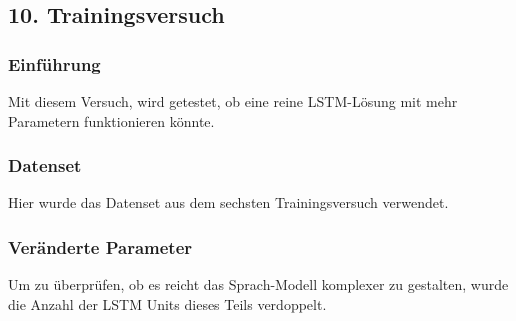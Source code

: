 \documentclass[pdftex,a4paper,halfparskip, article]{scrartcl}
\begin{document}
\subsection{10. Trainingsversuch}

\subsubsection*{Einführung}

Mit diesem Versuch, wird getestet, ob eine reine LSTM-Lösung mit mehr Parametern funktionieren könnte. 

\subsubsection*{Datenset}

Hier wurde das Datenset aus dem sechsten Trainingsversuch verwendet.

\subsubsection*{Veränderte Parameter}

Um zu überprüfen, ob es reicht das Sprach-Modell komplexer zu gestalten, wurde die Anzahl der LSTM Units dieses Teils verdoppelt. 
\end{document}
